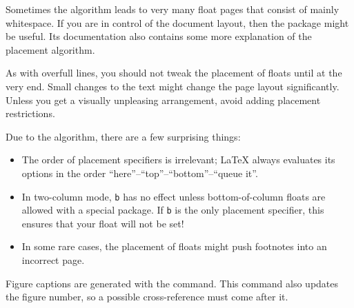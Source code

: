 Sometimes the algorithm leads to very many float pages that consist of mainly whitespace.
If you are in control of the document layout,
then the  package might be useful.
Its documentation also contains some more explanation of the placement algorithm.

\begin{practices}
As with overfull lines, you should not tweak the placement of floats until at the very end.
Small changes to the text might change the page layout significantly.
Unless you get a visually unpleasing arrangement, avoid adding placement restrictions.
\end{practices}

\begin{gotcha}
Due to the algorithm, there are a few surprising things:
\begin{itemize}
\item The order of placement specifiers is irrelevant;
    \LaTeX{} always evaluates its options in the order ``here''--``top''--``bottom''--``queue it''.
\item In two-column mode, \verb|b| has no effect
    unless bottom-of-column floats are allowed with a special package.
    If \verb|b| is the only placement specifier, this ensures that your float will not be set!
\item In some rare cases, the placement of floats might push footnotes into an incorrect page.
\end{itemize}
\end{gotcha}

Figure captions are generated with the  command.
This command also updates the figure number,
so a possible cross-reference  must come after it.


